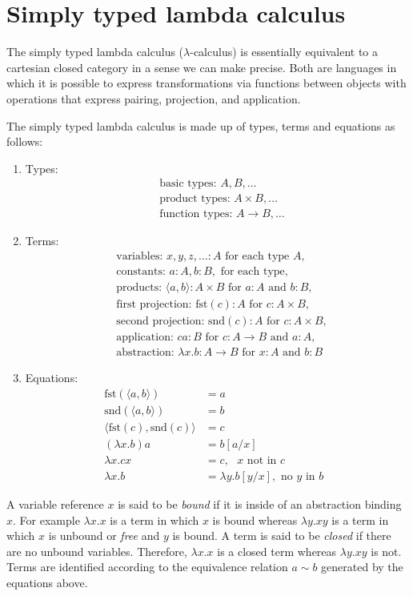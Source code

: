 \section{Simply typed lambda calculus}
The simply typed lambda calculus ($\lambda$-calculus) is essentially equivalent to a cartesian closed category in a sense we can make precise. Both are languages in which it is possible to express transformations via functions between objects with operations that express pairing, projection, and application.

The simply typed lambda calculus is made up of types, terms and equations as follows:
\begin{enumerate}
\item{Types:}
\begin{align*}
&\mbox{basic types: } A, B, \ldots\\
&\mbox{product types: } A \times B, \ldots\\
&\mbox{function types: } A \rightarrow B, \ldots
\end{align*}
\item{Terms:}
\begin{align*}
&\mbox{variables: } x, y, z, \ldots \colon A \mbox{ for each type } A,\\
&\mbox{constants: } a \colon A, b \colon B, \mbox{ for each type},\\
&\mbox{products: }\langle a, b \rangle \colon A \times B \mbox{ for } a:A \mbox{ and } b:B,\\
&\mbox{first projection: }\mbox{fst}(c) \colon A \mbox{ for } c \colon A \times B,\\
&\mbox{second projection: }\mbox{snd}(c) \colon A \mbox{ for } c \colon A \times B,\\
&\mbox{application: }ca \colon B \mbox{ for } c \colon A \rightarrow B \mbox{ and } a \colon A,\\
&\mbox{abstraction: }\lambda x. b \colon A \rightarrow B \mbox{ for } x \colon A \mbox{ and } b \colon B
\end{align*}
\item{Equations:}
\begin{align*}
            \mbox{fst}(\langle a, b \rangle) &= a\\
            \mbox{snd}(\langle a, b \rangle) &= b\\
            \langle \mbox{fst}(c), \mbox{snd}(c) \rangle &= c\\
            (\lambda x.b)a &= b[a/x]\\
            \lambda x.cx &= c, \mbox{ $x$ not in $c$ }\\
            \lambda x.b &= \lambda y.b [y/x], \mbox{ no $y$ in $b$ }
\end{align*}
\end{enumerate}
A variable reference $x$ is said to be \emph{bound} if it is inside of an abstraction binding $x$. For example $\lambda x. x$ is a term in which $x$ is bound whereas $\lambda y. x y$ is a term in which $x$ is unbound or \emph{free} and $y$ is bound. A term is said to be \emph{closed} if there are no unbound variables. Therefore, $\lambda x.x$ is a closed term whereas $\lambda y.xy$ is not. Terms are identified according to the equivalence relation $a \sim b$ generated by the equations above.

